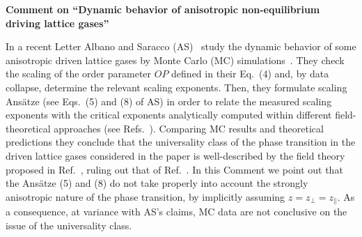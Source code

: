 \documentclass[twocolumn,prl,aps]{revtex4}
\begin{document}

{\bf Comment on ``Dynamic behavior of anisotropic non-equilibrium
driving lattice gases''}


In a recent Letter Albano and Saracco (AS)~\cite{as-02}  study the dynamic
behavior of some anisotropic driven lattice gases by
Monte Carlo (MC) simulations~\cite{STMC}.
They check the scaling of the order parameter $OP$ defined in their Eq.~(4)
and, by data collapse, determine the relevant scaling exponents. Then,
they formulate scaling Ans\"atze (see Eqs.~(5) and (8) 
of AS) in order to relate the measured scaling exponents 
with the critical exponents analytically computed within different 
field-theoretical approaches 
(see Refs.~\cite{js-lc-86,Garrido98}). 
Comparing MC results and theoretical predictions
they conclude that the universality class of the phase 
transition in the driven lattice gases considered in the paper 
is well-described by the field theory proposed in
Ref.~\cite{Garrido98}, ruling out that of Ref.~\cite{js-lc-86}.
In this Comment we point out that the 
Ans\"atze (5) and (8) 
do not take properly into account the strongly anisotropic nature of
the phase transition, by implicitly assuming $z = z_{\bot} = z_{\parallel}$. 
As a consequence, at variance with 
AS's claims, MC data are not conclusive on the issue of the  
universality class.
\end{document}
